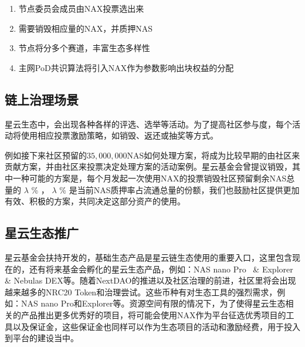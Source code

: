 \begin{enumerate}[\hspace{1cm}(a)]
  \item 节点委员会成员由NAX投票选出来
  \item 需要销毁相应量的NAX，并质押NAS
  \item 节点将分多个赛道，丰富生态多样性
  \item 主网PoD共识算法将引入NAX作为参数影响出块权益的分配
\end{enumerate}

\subsection{链上治理场景}
星云生态中，会出现各种各样的评选、选举等活动。为了提高社区参与度，每个活动将使用相应投票激励策略，如销毁、返还或抽奖等方式。

例如接下来社区预留的$35,000,000$NAS如何处理方案，将成为比较早期的由社区来贡献方案，并由社区来投票决定处理方案的活动案例。星云基金会曾提议销毁，其中一种可能的方案是，每个月发起一次使用NAX的投票销毁社区预留剩余NAS总量的 \(\lambda\) \% ， \(\lambda\) \% 是当前NAS质押率占流通总量的份额，我们也鼓励社区提供更加有效、积极的方案，共同决定这部分资产的使用。

\subsection{星云生态推广}
星云基金会扶持开发的，基础生态产品是星云链生态使用的重要入口，这里包含现在的，还有将来基金会孵化的星云生态产品，例如：NAS nano Pro~\cite{NASnano} \& Explorer~\cite{explorer} \& Nebulas DEX等。随着NextDAO的推进以及社区治理的前进，社区里将会出现越来越多的NRC20 Token和治理尝试。这些币种有对生态工具的强烈需求，例如：NAS nano Pro和Explorer等。资源空间有限的情况下，为了使得星云生态相关的产品推出更多优秀好的项目，将可能会使用NAX作为平台征选优秀项目的工具以及保证金，这些保证金也同样可以作为生态项目的活动和激励经费，用于投入到平台的建设当中。
